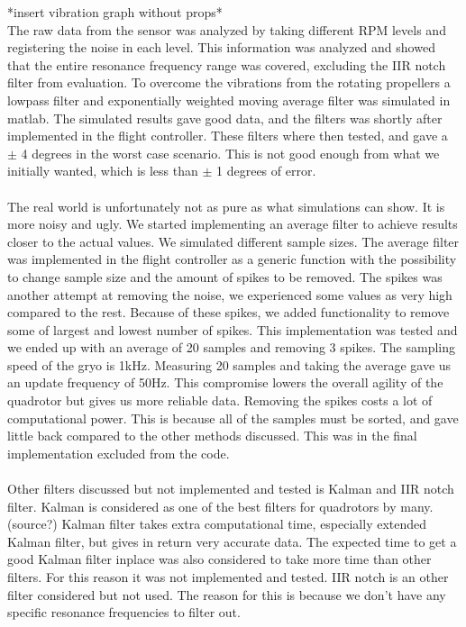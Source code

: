 *insert vibration graph without props*
\\
The raw data from the sensor was analyzed by taking different RPM levels and registering the noise in each level. This information was analyzed and showed that the entire resonance frequency range was covered, excluding the IIR notch filter from evaluation.  To overcome the vibrations from the rotating propellers a lowpass filter and exponentially weighted moving average filter was simulated in matlab. The simulated results gave good data, and the filters was shortly after implemented in the flight controller. These filters where then tested, and gave a $\pm$ 4 degrees in the worst case scenario. This is not good enough from what we initially wanted, which is less than $\pm$ 1 degrees of error. \\
\\
The real world is unfortunately not as pure as what simulations can show. It is more noisy and ugly. We started implementing an average filter to achieve results closer to the actual values. We simulated different sample sizes. The average filter was implemented in the flight controller as a generic function with the possibility to change sample size and the amount of spikes to be removed. The spikes was another attempt at removing the noise, we experienced some values as very high compared to the rest. Because of these spikes, we added functionality to remove some of largest and lowest number of spikes. This implementation was tested and we ended up with an average of 20 samples and removing 3 spikes. The sampling speed of the gryo is 1kHz. Measuring 20 samples and taking the average gave us an update frequency of 50Hz. This compromise lowers the overall agility of the quadrotor but gives us more reliable data. Removing the spikes costs a lot of computational power. This is because all of the samples must be sorted, and gave little back compared to the other methods discussed. This was in the final implementation excluded from the code.\\
\\
Other filters discussed but not implemented and tested is Kalman and IIR notch filter. Kalman is considered as one of the best filters for quadrotors by many. (source?) Kalman filter takes extra computational time, especially extended Kalman filter, but gives in return very accurate data. The expected time to get a good Kalman filter inplace was also considered to take more time than other filters. For this reason it was not implemented and tested. IIR notch is an other filter considered but not used. The reason for this is because we don't have any specific resonance frequencies to filter out. \\
